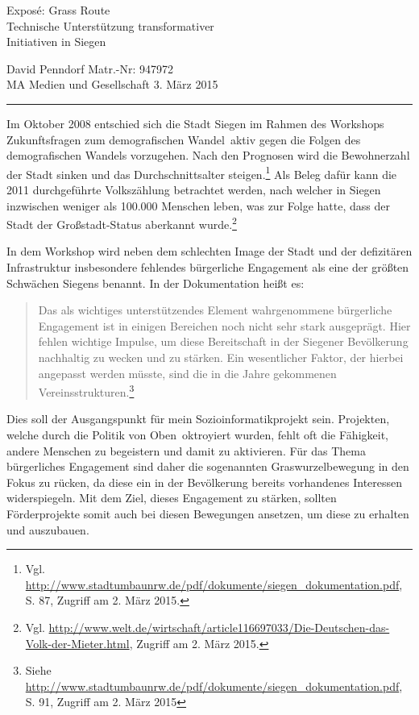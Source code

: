 \documentclass[a4paper,oneside,DIV8,10pt]{scrartcl}
\makeatletter
\newcommand{\lz}[3]{\begin{singlespace} \begin{quotation}\glqq #1\grqq \footnote{Siehe #2, {#3}} \end{quotation} \end{singlespace} }
\newcommand{\handouttitle}[4]
   {\begin{center}
      \Large #4
    \end{center}

    \bigskip

    \noindent
    #1 
    #2
        \hfill
    #3 \\
  
    \noindent
    \rule{\linewidth}{.5pt}

    \bigskip

    \@afterindentfalse\@afterheading
   }
\makeatother
\begin{document}
\renewcommand{\thesection}{\Roman{section}}
\renewcommand{\thesection}{\Roman{section}}

\renewcommand{\thesection}{\arabic{section}}
\renewcommand{\thesection}{\arabic{section}}
\setcounter{section}{0}
\setcounter{page}{1}

  \handouttitle{David Penndorf}
               {Matr.-Nr: 947972 \\ MA Medien und Gesellschaft}
               {3. März 2015}
               { Exposé: \glqq Grass Route\grqq \\ Technische Unterstützung transformativer \\ Initiativen in Siegen}
               
\onehalfspacing
Im Oktober 2008 entschied sich die Stadt Siegen im Rahmen des Workshops \glqq Zukunftsfragen zum demografischen Wandel\grqq ~aktiv gegen die Folgen des demografischen Wandels vorzugehen. Nach den Prognosen wird die Bewohnerzahl der Stadt sinken und das Durchschnittsalter steigen.\footnote{Vgl. \url{http://www.stadtumbaunrw.de/pdf/dokumente/siegen_dokumentation.pdf}, S. 87, Zugriff am 2. März 2015.}
Als Beleg dafür kann die 2011 durchgeführte Volkszählung betrachtet werden, nach welcher in Siegen inzwischen weniger als 100.000 Menschen leben, was zur Folge hatte, dass der Stadt der Großstadt-Status aberkannt wurde.\footnote{Vgl. \url{http://www.welt.de/wirtschaft/article116697033/Die-Deutschen-das-Volk-der-Mieter.html}, Zugriff am 2. März 2015.}

In dem Workshop wird neben dem schlechten Image der Stadt und der defizitären Infrastruktur insbesondere fehlendes bürgerliche Engagement als eine der größten Schwächen Siegens benannt. In der Dokumentation heißt es:
\vspace{-0.5cm}
\lz{Das als wichtiges unterstützendes Element wahrgenommene bürgerliche Engagement ist in einigen Bereichen noch nicht sehr stark ausgeprägt. Hier fehlen wichtige Impulse, um diese Bereitschaft in der Siegener Bevölkerung nachhaltig zu wecken und zu stärken. Ein wesentlicher Faktor, der hierbei angepasst werden müsste, sind die in die Jahre gekommenen Vereinsstrukturen.}{\url{http://www.stadtumbaunrw.de/pdf/dokumente/siegen_dokumentation.pdf}}{S. 91, Zugriff am 2. März 2015}

Dies soll der Ausgangspunkt für mein Sozioinformatikprojekt sein. Projekten, welche durch die Politik \glqq von Oben\grqq ~oktroyiert wurden, fehlt oft die Fähigkeit, andere Menschen zu begeistern und damit zu aktivieren. Für das Thema bürgerliches Engagement sind daher die sogenannten Graswurzelbewegung in den Fokus zu rücken, da diese ein in der Bevölkerung bereits vorhandenes Interessen widerspiegeln. Mit dem Ziel, dieses Engagement zu stärken, sollten Förderprojekte somit auch bei diesen Bewegungen ansetzen, um diese zu erhalten und auszubauen.
\end{document}
